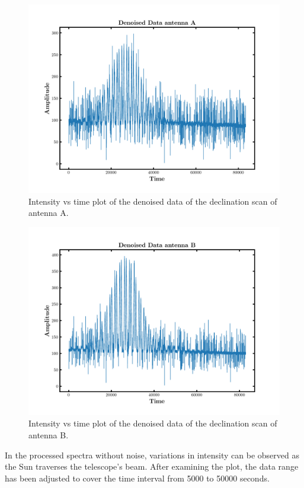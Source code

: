 \documentclass[12pt]{article}
\begin{document}
 \begin{figure}[H]
    \centering
    \includegraphics[scale=.6]{fig/Denoised_Data_antena_A.png}
    \caption{Intensity vs time plot of the denoised data of the declination scan of antenna A.}
    \label{fig2.6}
 \end{figure}

 \begin{figure}[H]
    \centering
    \includegraphics[scale=.6]{fig/Denoised_Data_antena_B.png}
    \caption{Intensity vs time plot of the denoised data of the declination scan of antenna B.}
    \label{fig2.7}
 \end{figure}

 In the processed spectra without noise, variations in intensity can be observed as the Sun traverses the telescope's beam. After examining the plot, the data range has been adjusted to cover the time interval from 5000 to 50000 seconds.
\end{document}
